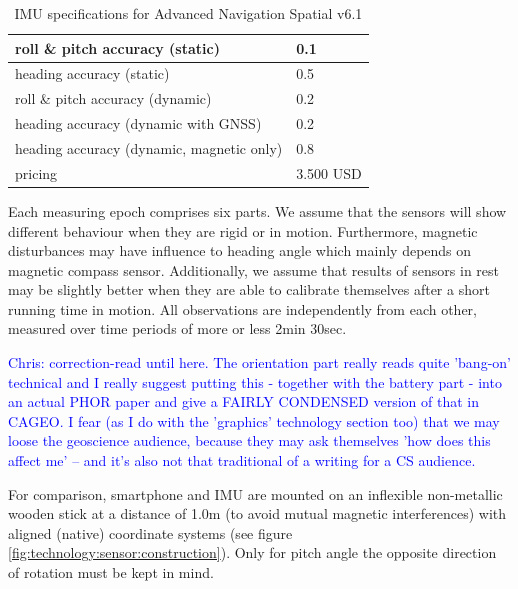 \documentclass[review]{elsarticle}
\begin{document}
\begin{center}
\begin{small}
\begin{longtable}[HT]{| p{8cm} | p{2cm} |}
	\caption{\gls{IMU} specifications for Advanced Navigation Spatial v6.1}
	\label{table:sensor:imu}
	\endhead
		\hline
		roll \& pitch accuracy (static) & 0.1 \\ \hline
		heading accuracy (static) & 0.5 \\ \hline
		roll \& pitch accuracy (dynamic) & 0.2 \\ \hline
		heading accuracy (dynamic with \gls{GNSS}) & 0.2 \\ \hline
		heading accuracy (dynamic, magnetic only) & 0.8 \\ \hline
		pricing & 3.500 USD                                                                  \\ \hline
\end{longtable}
\end{small}
\end{center}



Each measuring epoch comprises six parts. We assume that the sensors will show different behaviour when they are rigid or in motion. Furthermore, magnetic disturbances may have influence to heading angle which mainly depends on magnetic compass sensor. Additionally, we assume that results of sensors in rest may be slightly better when they are able to calibrate themselves after a short running time in motion. All observations are independently from each other, measured over time periods of more or less 2min 30sec. 

\textcolor{blue}{Chris: correction-read until here. The orientation part really reads quite 'bang-on' technical and I really suggest putting this - together with the battery part - into an actual PHOR paper and give a FAIRLY CONDENSED version of that in CAGEO. I fear (as I do with the 'graphics' technology section too) that we may loose the geoscience audience, because they may ask themselves 'how does this affect me' -- and it's also not that traditional of a writing for a CS audience.}

For comparison, smartphone and \gls{IMU} are mounted on an inflexible non-metallic wooden stick at a distance of 1.0m (to avoid mutual magnetic interferences) with aligned (native) coordinate systems (see figure \ref{fig:technology:sensor:construction}). Only for pitch angle the opposite direction of rotation must be kept in mind.  
\end{document}
